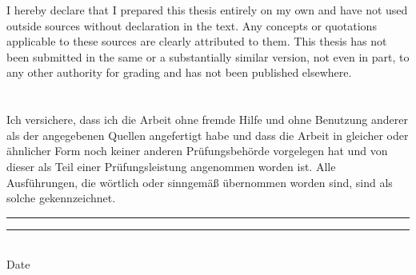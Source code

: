 
\begin{declaration}

I hereby declare that I prepared this thesis entirely on my own and have not used outside sources without declaration in the text.
Any concepts or quotations applicable to these sources are clearly attributed to them.
This thesis has not been submitted in the same or a substantially similar version, not even in part, to any other authority for grading and has not been published elsewhere.\\ \\ \\
Ich versichere, dass ich die Arbeit ohne fremde Hilfe und ohne Benutzung anderer als der angegebenen Quellen angefertigt habe und dass die Arbeit in gleicher oder ähnlicher Form noch keiner anderen Prüfungsbehörde vorgelegen hat und von dieser als Teil einer Prüfungsleistung angenommen worden ist.
Alle Ausführungen, die wörtlich oder sinngemäß übernommen worden sind, sind als solche gekennzeichnet.

\makeatletter
\vspace{2cm}
\rule{4cm}{0.1pt} \hfill \rule{7cm}{0.1pt} \\
\hspace*{1.5cm} Date \hspace*{7cm} \@author
\makeatother


\end{declaration}

